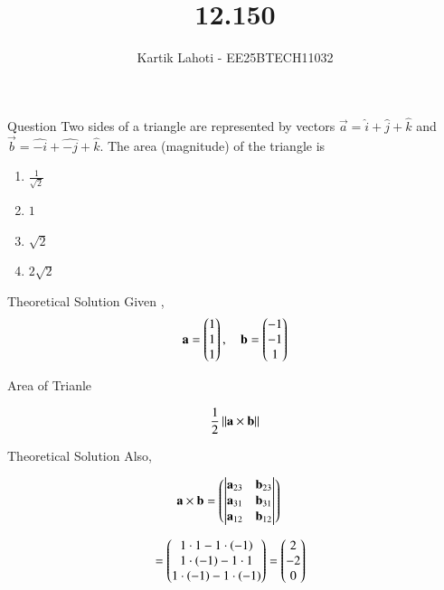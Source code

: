 \documentclass{beamer}
\title %
{12.150}
\author 
{Kartik Lahoti - EE25BTECH11032}
\begin{document}
\frame{\titlepage}
\begin{frame}{Question}
Two sides of a triangle are represented by vectors $\vec{a} = \hat{i}+\hat{j}+\hat{k}$ and 
$\vec{b} = \hat{-i}+\hat{-j}+\hat{k}$. The area (magnitude) of the triangle is
\begin{multicols}
\begin{enumerate}
    \item $\frac{1}{\sqrt{2}}$
    \item $1$
    \item $\sqrt{2}$
    \item $2\sqrt{2}$
\end{enumerate}
\end{multicols}

\end{frame}

\begin{frame}{Theoretical Solution}
Given , 
\begin{align}
    \mathbf{a} = \begin{pmatrix}1\\1\\1\end{pmatrix} , \quad \mathbf{b} = \begin{pmatrix}-1\\-1\\1\end{pmatrix}
\end{align}

Area of Trianle 

\begin{align}
    \frac{1}{2}\left\lVert\mathbf{a}\times\mathbf{b}\right\rVert
\end{align}
\end{frame}

\begin{frame}{Theoretical Solution}
Also, 

\begin{align}
    \mathbf{a}\times\mathbf{b} &= \begin{pmatrix}\begin{vmatrix}\mathbf{a}_{23} \quad \mathbf{b}_{23}\end{vmatrix} \\ \begin{vmatrix}\mathbf{a}_{31} \quad \mathbf{b}_{31}\end{vmatrix} \\ \begin{vmatrix}\mathbf{a}_{12} \quad \mathbf{b}_{12}\end{vmatrix}\end{pmatrix}
\end{align}

\begin{align}
    &= \begin{pmatrix}1\cdot1 - 1\cdot\left(-1\right) \\ 1\cdot\left(-1\right) - 1\cdot1 \\ 1\cdot\left(-1\right) - 1\cdot\left(-1\right)\end{pmatrix} = \begin{pmatrix}2\\-2\\0\end{pmatrix}
\end{align}
\end{frame}
\end{document}
